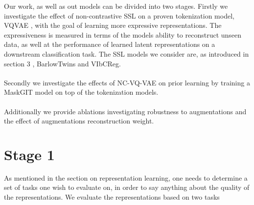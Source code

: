 \documentclass[../../thesis.tex]{subfiles}
\begin{document}
Our work, as well as out models can be divided into two stages. Firstly we investigate the effect of non-contrastive SSL on a proven tokenization model, VQVAE \cite{VQVAE}, with the goal of learning more expressive representations. The expressiveness is measured in terms of the models ability to reconstruct unseen data, as well at the performance of learned latent representations on a downstream classification task. The SSL models we consider are, as introduced in section 3 , BarlowTwins and VIbCReg.\\\\

Secondly we investigate the effects of NC-VQ-VAE on prior learning by training a MaskGIT model on top of the tokenization models.\\\\

Additionally we provide ablations investigating robustness to augmentations and the effect of augmentations reconstruction weight. \newline

\section{Stage 1}

As mentioned in the section on representation learning, one needs to determine a set of tasks one wish to evaluate on, in order to say anything about the quality of the representations. We evaluate the representations based on two tasks




\end{document}
